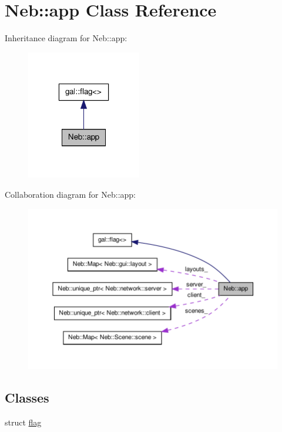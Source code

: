 \hypertarget{classNeb_1_1app}{\section{\-Neb\-:\-:app \-Class \-Reference}
\label{classNeb_1_1app}
}


\-Inheritance diagram for \-Neb\-:\-:app\-:\nopagebreak
\begin{figure}[H]
\begin{center}
\leavevmode
\includegraphics[width=142pt]{classNeb_1_1app__inherit__graph}
\end{center}
\end{figure}


\-Collaboration diagram for \-Neb\-:\-:app\-:\nopagebreak
\begin{figure}[H]
\begin{center}
\leavevmode
\includegraphics[width=350pt]{classNeb_1_1app__coll__graph}
\end{center}
\end{figure}
\subsection*{\-Classes}
\begin{DoxyCompactItemize}
\item 
struct \hyperlink{structNeb_1_1app_1_1flag}{flag}
\end{DoxyCompactItemize}
